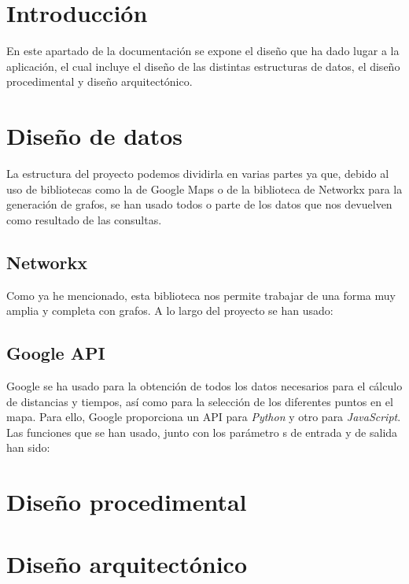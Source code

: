 
\section{Introducción}
En este apartado de la documentación se expone el diseño que ha dado lugar a la aplicación, el cual incluye el diseño de las distintas estructuras de datos, el diseño procedimental y diseño arquitectónico.
\section{Diseño de datos}
La estructura del proyecto podemos dividirla en varias partes ya que, debido al uso de bibliotecas como la de Google Maps o de la biblioteca de Networkx para la generación de grafos, se han usado todos o parte de los datos que nos devuelven como resultado de las consultas.

\subsection{Networkx}
Como ya he mencionado, esta biblioteca nos permite trabajar de una forma muy amplia y completa con grafos. A lo largo del proyecto se han usado:



\subsection{Google API}
Google se ha usado para la obtención de todos los datos necesarios para el cálculo de distancias y tiempos, así como para la selección de los diferentes puntos en el mapa. Para ello, Google proporciona un API para \textit{Python} y otro para \textit{JavaScript}. Las funciones que se han usado, junto con los parámetro s de entrada y de salida han sido:



\section{Diseño procedimental}


\section{Diseño arquitectónico}


